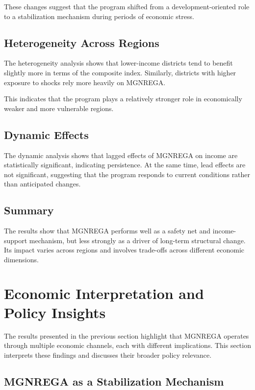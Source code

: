 \documentclass[12pt]{article}
\begin{document}
These changes suggest that the program shifted from a development-oriented role to a stabilization mechanism during periods of economic stress.

\subsection{Heterogeneity Across Regions}

The heterogeneity analysis shows that lower-income districts tend to benefit slightly more in terms of the composite index. Similarly, districts with higher exposure to shocks rely more heavily on MGNREGA.

This indicates that the program plays a relatively stronger role in economically weaker and more vulnerable regions.

\subsection{Dynamic Effects}

The dynamic analysis shows that lagged effects of MGNREGA on income are statistically significant, indicating persistence. At the same time, lead effects are not significant, suggesting that the program responds to current conditions rather than anticipated changes.

\subsection{Summary}

The results show that MGNREGA performs well as a safety net and income-support mechanism, but less strongly as a driver of long-term structural change. Its impact varies across regions and involves trade-offs across different economic dimensions.



\section{Economic Interpretation and Policy Insights}

The results presented in the previous section highlight that MGNREGA operates through multiple economic channels, each with different implications. This section interprets these findings and discusses their broader policy relevance.

\subsection{MGNREGA as a Stabilization Mechanism}
\end{document}
